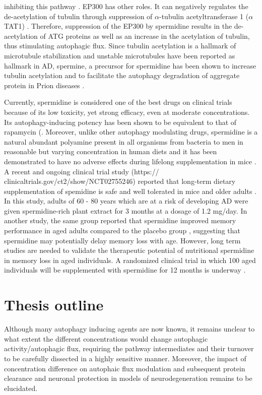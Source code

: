 inhibiting this pathway \citep{Eisenberg2014,Lee2009,Sebti2014}. EP300 has other roles. It can negatively regulates the de-acetylation of tubulin through suppression of $\alpha$-tubulin acetyltransferase 1 ($\alpha$TAT1) \citep{Mackeh2014}. Therefore, suppression of the EP300 by spermidine results in the de-acetylation of ATG proteins as well as an  increase in the acetylation of tubulin, thus stimulating autophagic flux. Since tubulin acetylation is a hallmark of microtubule stabilization and unstable microtubules have been reported as hallmark in AD, spermine, a precursor for spermidine has been shown to increase tubulin acetylation and to facilitate the autophagy  degradation of aggregate protein in Prion diseases \citep{Phadwal2018}.

Currently, spermidine is considered one of the best drugs on clinical trials because of its low toxicity, yet strong efficacy, even at moderate concentrations. Its autophagy-inducing potency has been shown to be equivalent to that of rapamycin (\citep{DuToit2018b}. Moreover, unlike other autophagy modulating drugs, spermidine is a natural abundant polyamine present in all organisms from bacteria to men in reasonable but varying concentration in human diets and it has been demonstrated to have no adverse effects during lifelong supplementation in mice \citep{Eisenberg2016a,Eisenberg2016b}. A recent and ongoing clinical trial study (https:// clinicaltrials.gov/ct2/show/NCT02755246) reported that long-term dietary supplementation of spemidine is safe and well tolerated in mice and older adults \citep{Schwarz2018}. In this study, adults of 60 - 80 years which are at a risk of developing AD were given spermidine-rich plant extract for 3 months at a dosage of 1.2 mg/day. In another study, the same group reported that spermidine improved memory performance in aged adults compared to the placebo group \citep{Wirth2018}, suggesting that spermidine may potentially delay memory loss with age. However, long term studies are needed to validate the therapeutic potential of nutritional spermidine in memory loss in aged individuals. A randomized clinical trial in which 100 aged individuals will be supplemented with spermidine for 12 months is underway \citep{Wirth2019}.

\section{Thesis outline}
Although many autophagy inducing agents are now known, it remains unclear to what extent the different concentrations would change autophagic activity/autophagic flux, requiring the pathway intermediates and their turnover to be carefully dissected  in a highly sensitive manner. Moreover, the impact of concentration difference on autophaic flux modulation and subsequent protein clearance and neuronal protection in models of neurodegeneration remains to be elucidated. 

